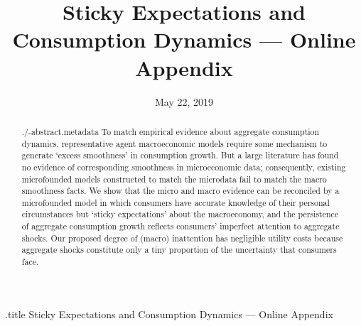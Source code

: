 \documentclass[titlepage]{\econtex}
\begin{document}

	
	
	
	\begin{verbatimwrite}{\jobname.title}
		Sticky Expectations and Consumption Dynamics --- Online Appendix
	\end{verbatimwrite}
	
	\hfill{\tiny \jobname}
	
	\title{Sticky Expectations and Consumption Dynamics --- Online Appendix}
	
	
	
	
	\date{May 22, 2019}
	\maketitle
	
	\hypertarget{Abstract}{}
	\begin{abstract}
		\begin{verbatimwrite}{./\jobname-abstract.metadata}
			To match empirical evidence about aggregate consumption dynamics, representative agent macroeconomic models require some mechanism to generate `excess smoothness' in consumption growth.   But a large literature has found no evidence of corresponding smoothness in microeconomic data; consequently, existing microfounded models constructed to match the microdata fail to match the macro smoothness facts.  We show that the micro and macro evidence can be reconciled by a microfounded model in which consumers have accurate knowledge of their personal circumstances but `sticky expectations' about the macroeconomy, and the persistence of aggregate consumption growth reflects consumers' imperfect attention to aggregate shocks. Our proposed degree of (macro) inattention has negligible utility costs because aggregate shocks constitute only a tiny proportion of the uncertainty that consumers face.%
		\end{verbatimwrite}
		
	\end{abstract}
	
\end{document}
